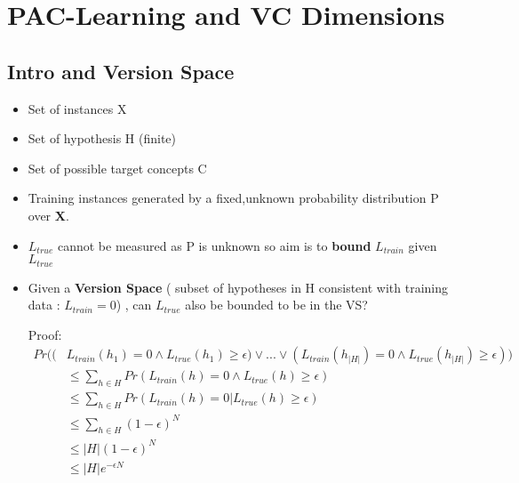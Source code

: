 \documentclass[12pt]{article} %
\begin{document}
\section{PAC-Learning and VC Dimensions}
\subsection{Intro and Version Space}
\begin{itemize}
\item Set of instances X
\item Set of hypothesis H (finite)
\item Set of possible target concepts C
\item Training instances generated by a fixed,unknown probability distribution P over \textbf{X}.



\begin{center}
\end{center}

\item $L_{true}$ cannot be measured as P is unknown so aim is to \textbf{bound} $L_{train}$ given $L_{true}$
\item Given a \textbf{Version Space} ( subset of hypotheses in H consistent with training data : $L_{train}=0$) , can $L_{true}$ also be bounded to be in the VS?


\begin{center}
\end{center}
Proof:
\begin{align*}
 Pr((&L_{train}(h_1) = 0 \land L_{true}(h_1) \geq \epsilon) \lor
 ... \lor (L_{train}(h_{|H|})= 0 \land L_{true}(h_{|H|}) \geq \epsilon))\\
  &\leq \sum \limits_{h \in H} Pr(L_{train}(h)= 0 \land L_{true}(h) \geq \epsilon)\\
&\leq \sum \limits_{h \in H} Pr(L_{train}(h)= 0 | L_{true}(h) \geq \epsilon)\\
&\leq \sum \limits_{h \in H} (1-\epsilon)^N\\
&\leq |H|(1-\epsilon)^N \\
&\leq |H|e^{-\epsilon N}
\end{align*}


\end{itemize}
\end{document}
